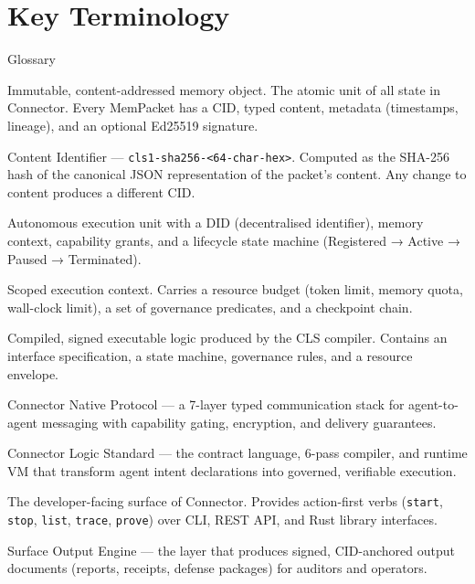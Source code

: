 \section{Key Terminology}

\begin{defbox}{Glossary}
\begin{description}[leftmargin=2.4cm, style=nextline, itemsep=4pt]
  \item[\texttt{MemPacket}]
    Immutable, content-addressed memory object. The atomic unit of all state in Connector.
    Every MemPacket has a CID, typed content, metadata (timestamps, lineage), and an
    optional Ed25519 signature.
  \item[\texttt{CID}]
    Content Identifier — \texttt{cls1-sha256-<64-char-hex>}. Computed as the SHA-256
    hash of the canonical JSON representation of the packet's content. Any change
    to content produces a different CID.
  \item[\texttt{Agent}]
    Autonomous execution unit with a DID (decentralised identifier), memory context,
    capability grants, and a lifecycle state machine (Registered → Active → Paused →
    Terminated).
  \item[\texttt{Session}]
    Scoped execution context. Carries a resource budget (token limit, memory quota,
    wall-clock limit), a set of governance predicates, and a checkpoint chain.
  \item[\texttt{Contract}]
    Compiled, signed executable logic produced by the CLS compiler. Contains an
    interface specification, a state machine, governance rules, and a resource envelope.
  \item[\texttt{CNP}]
    Connector Native Protocol — a 7-layer typed communication stack for
    agent-to-agent messaging with capability gating, encryption, and delivery guarantees.
  \item[\texttt{CLS}]
    Connector Logic Standard — the contract language, 6-pass compiler, and runtime
    VM that transform agent intent declarations into governed, verifiable execution.
  \item[\texttt{Glue}]
    The developer-facing surface of Connector. Provides action-first verbs
    (\texttt{start}, \texttt{stop}, \texttt{list}, \texttt{trace}, \texttt{prove}) over
    CLI, REST API, and Rust library interfaces.
  \item[\texttt{SOE}]
    Surface Output Engine — the layer that produces signed, CID-anchored output
    documents (reports, receipts, defense packages) for auditors and operators.
\end{description}
\end{defbox}

